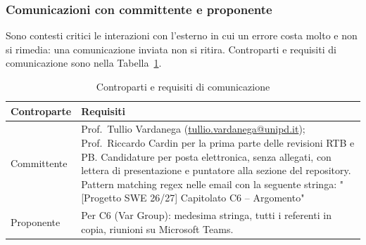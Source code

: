 \documentclass[a4paper, 11pt]{article}
\begin{document}
\subsubsection{Comunicazioni con committente e proponente}\label{sec:esterne}
Sono contesti critici le interazioni con l'esterno in cui un errore costa molto e non si rimedia: una comunicazione inviata non si ritira. Controparti e requisiti di comunicazione sono nella Tabella~\ref{tab:controparti}.

\begin{table}[htbp]
\centering
\small
\caption{Controparti e requisiti di comunicazione}
\label{tab:controparti}
\begin{tabularx}{\textwidth}{@{} l X @{}}
\toprule
\textbf{Controparte} & \textbf{Requisiti} \\
\midrule
Committente & Prof.\ Tullio Vardanega (\href{mailto:tullio.vardanega@unipd.it}{tullio.vardanega@unipd.it}); Prof.\ Riccardo Cardin per la prima parte delle revisioni RTB e PB. Candidature per posta elettronica, senza allegati, con lettera di presentazione e puntatore alla sezione del repository. Pattern matching regex nelle email con la seguente stringa: "[Progetto SWE 26/27] Capitolato C6 – Argomento" \\
\addlinespace
Proponente & Per C6 (Var Group): medesima stringa, tutti i referenti in copia, riunioni su Microsoft Teams. \\
\bottomrule
\end{tabularx}
\end{table}
\end{document}
